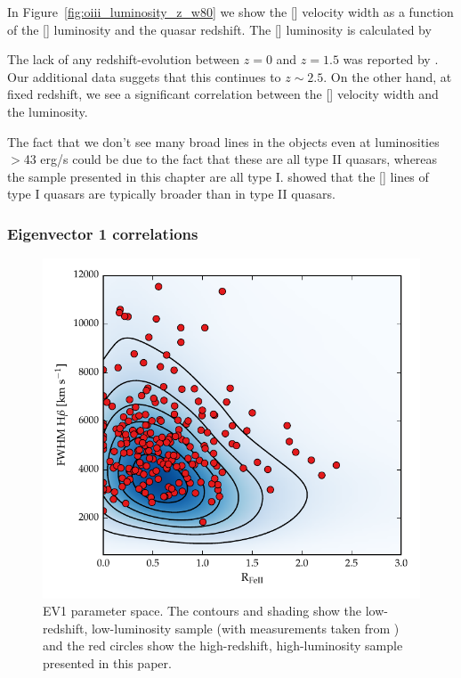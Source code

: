 In Figure~\ref{fig:oiii_luminosity_z_w80} we show the [] velocity width as a function of the [] luminosity and the quasar redshift. 
The [] luminosity is calculated by 





The lack of any redshift-evolution between $z=0$ and $z=1.5$ was reported by \citet{harrison16}.
Our additional data suggets that this continues to $z\sim2.5$. 
On the other hand, at fixed redshift, we see a significant correlation between the [] velocity width and the luminosity. 

The fact that we don't see many broad lines in the \citet{zakamska14} objects even at luminosities $>$43 erg/s could be due to the fact that these are all type II quasars, whereas the sample presented in this chapter are all type I. 
\citet{mullaney13} showed that the [] lines of type I quasars are typically broader than in type II quasars. 


\subsubsection{Eigenvector 1 correlations}

\begin{figure}
    \includegraphics[width=\columnwidth]{figures/chapter04/ev1_lowz.pdf} 
    \caption{\ac{EV1} parameter space. The contours and shading show the low-redshift, low-luminosity sample (with measurements taken from \citet{shen11}) and the red circles show the high-redshift, high-luminosity sample presented in this paper.}      
    \label{fig:ev1_lowz}
\end{figure}

